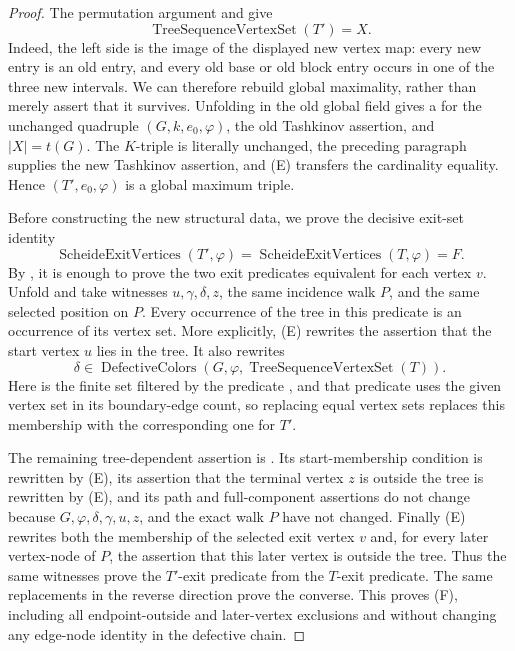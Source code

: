 \begin{proof}
The permutation argument and  give
\[
 \tag{E} \operatorname{TreeSequenceVertexSet}(T')=X.
\]
Indeed, the left side is the image of the displayed new vertex map: every
new entry is an old entry, and every old base or old block entry occurs in
one of the three new intervals.  We can therefore rebuild global
maximality, rather than merely assert that it survives.  Unfolding
 in the old global field gives a
 for the unchanged quadruple $(G,k,e_0,\varphi)$, the old
Tashkinov assertion, and $|X|=t(G)$.  The $K$-triple is literally unchanged,
the preceding paragraph supplies the new Tashkinov assertion, and (E)
transfers the cardinality equality.  Hence
$(T',e_0,\varphi)$ is a global maximum triple.

Before constructing the new structural data, we prove the decisive exit-set
identity
\[
 \tag{F}
 \operatorname{ScheideExitVertices}(T',\varphi)
 =\operatorname{ScheideExitVertices}(T,\varphi)=F.
\]
By , it is enough to prove the two exit
predicates equivalent for each vertex $v$.  Unfold
 and take witnesses
$u,\gamma,\delta,z$, the same incidence walk $P$, and the same selected
position on $P$.  Every occurrence of the tree in this predicate is an
occurrence of its vertex set.  More explicitly, (E) rewrites the assertion
that the start vertex $u$ lies in the tree.  It also rewrites
\[
 \delta\in
 \operatorname{DefectiveColors}(G,\varphi,
     \operatorname{TreeSequenceVertexSet}(T)).
\]
Here  is the finite set filtered by the predicate
, and that predicate uses the given vertex set in
its boundary-edge count, so replacing equal vertex sets replaces this
membership with the corresponding one for $T'$.

The remaining tree-dependent assertion is
.  Its start-membership condition is
rewritten by (E), its assertion that the terminal vertex $z$ is outside the
tree is rewritten by (E), and its path and full-component assertions do not
change because $G,\varphi,\delta,\gamma,u,z$, and the exact walk $P$ have
not changed.  Finally (E) rewrites both the membership of the selected exit
vertex $v$ and, for every later vertex-node of $P$, the assertion that this
later vertex is outside the tree.  Thus the same witnesses prove the
$T'$-exit predicate from the $T$-exit predicate.  The same replacements in
the reverse direction prove the converse.  This proves (F), including all
endpoint-outside and later-vertex exclusions and without changing any
edge-node identity in the defective chain.


\end{proof}
